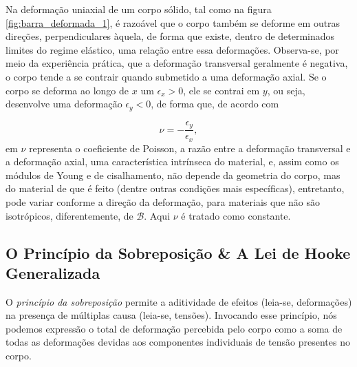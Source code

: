 Na deformação uniaxial de um corpo sólido, tal como na figura \ref{fig:barra_deformada_1}, é razoável que o corpo também se deforme em outras direções, perpendiculares àquela, de forma que existe, dentro de determinados limites do regime elástico, uma relação entre essa deformações. Observa-se, por meio da experiência prática, que a deformação transversal geralmente é negativa, o corpo tende a se contrair quando submetido a uma deformação axial. Se o corpo se deforma ao longo de $x$ um $\epsilon_x > 0$, ele se contrai em $y$, ou seja, desenvolve uma deformação $\epsilon_y < 0$, de forma que, de acordo com 

\begin{equation}
    \nu = -\frac{\epsilon_y}{\epsilon_x},
    \label{eq:coeficiente_de_poisson}
\end{equation}
em $\nu$ representa o coeficiente de Poisson, a razão entre a deformação transversal e a deformação axial, uma característica intrínseca do material, e, assim como os módulos de Young e de cisalhamento, não depende da geometria do corpo, mas do material de que é feito (dentre outras condições mais específicas), entretanto, pode variar conforme a direção da deformação, para materiais que não são isotrópicos, diferentemente, de $\mathcal{B}$. Aqui $\nu$ é tratado como constante.

\subsection{O Princípio da Sobreposição \& A Lei de Hooke Generalizada}

\begin{citacao}
    O \emph{princípio da sobreposição} permite a aditividade de efeitos (leia-se, deformações) na presença de múltiplas causa (leia-se, tensões). Invocando esse princípio, nós podemos expressão o total de deformação percebida pelo corpo como a soma de todas as deformações devidas aos componentes individuais de tensão presentes no corpo. \cite[pág. 252, tradução livre]{lub}
\end{citacao}


